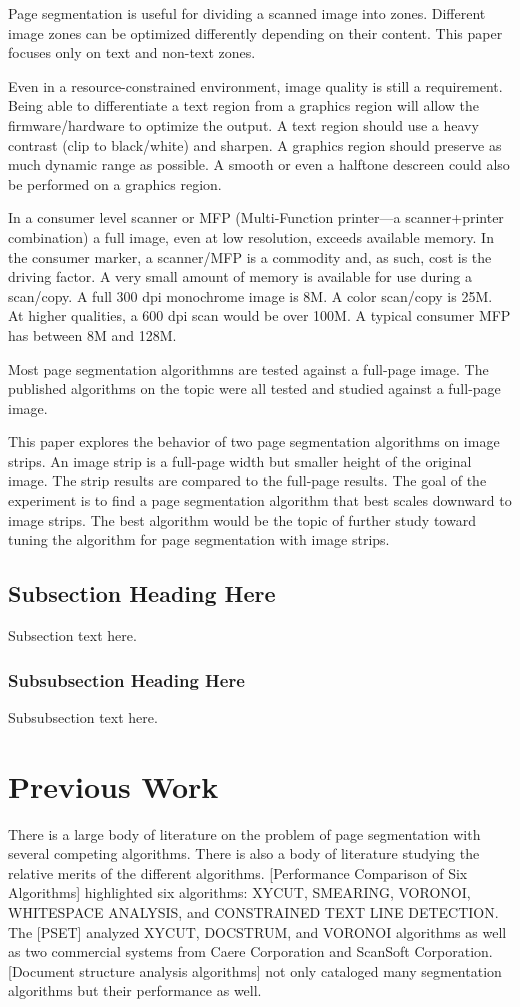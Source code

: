 \documentclass[conference]{IEEEtran}
\begin{document}
Page segmentation is useful for dividing a scanned image into zones. Different
image zones can be optimized differently depending on their content. This paper
focuses only on text and non-text zones. 

Even in a resource-constrained environment, image quality is still a
requirement. Being able to differentiate a text region from a graphics region
will allow the firmware/hardware to optimize the output. A text region should
use a heavy contrast (clip to black/white) and sharpen. A graphics region
should preserve as much dynamic range as possible. A smooth or even a halftone
descreen could also be performed on a graphics region.

In a consumer level scanner or MFP (Multi-Function printer—a scanner+printer
combination) a full image, even at low resolution, exceeds available
memory. In the consumer marker, a scanner/MFP is a commodity and, as such, cost
is the driving factor. A very small amount of memory is available for use
during a scan/copy. A full 300 dpi monochrome image is 8M. A color scan/copy is
25M. At higher qualities, a 600 dpi scan would be over 100M. A typical consumer
MFP has between 8M and 128M. 

Most page segmentation algorithmns are tested against a full-page image. The
published algorithms on the topic were all tested and studied against a full-page
image.

This paper explores the behavior of two page segmentation algorithms on image
strips.  An image strip is a full-page width but smaller height of the original
image. The strip results are compared to the full-page results. The goal of the
experiment is to find a page segmentation algorithm that best scales downward
to image strips. The best algorithm would be the topic of further study toward
tuning the algorithm for page segmentation with image strips.


\subsection{Subsection Heading Here}
Subsection text here.


\subsubsection{Subsubsection Heading Here}
Subsubsection text here.

\section{Previous Work}
There is a large body of literature on the problem of page segmentation with
several competing algorithms. There is also a body of literature studying the
relative merits of the different algorithms. [Performance Comparison of Six
Algorithms] highlighted six algorithms: XYCUT, SMEARING, VORONOI, WHITESPACE
ANALYSIS, and CONSTRAINED TEXT LINE DETECTION. The [PSET] analyzed XYCUT,
DOCSTRUM, and VORONOI algorithms as well as two commercial systems from
Caere Corporation and ScanSoft Corporation. [Document structure analysis
algorithms] not only cataloged many segmentation algorithms but their
performance as well.
\end{document}
